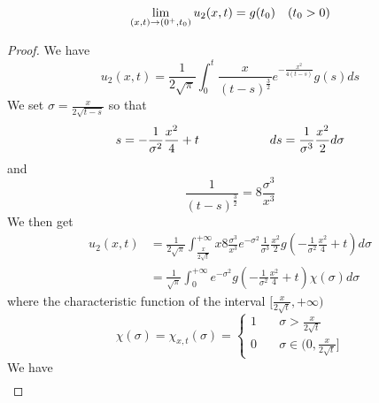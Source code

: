 \begin{itemize}
\begin{PropBox}
\begin{Proposition}
            \begin{equation*}
                \lim_{(x,t) \rightarrow (0^+, t_0)} u_2(x,t) = g(t_0) \quad (t_0 > 0)
            \end{equation*}
        \end{Proposition}
    \end{PropBox}
    \begin{ProofBox}
        \begin{proof}
            We have
            \begin{equation*}
                u_2(x,t) = \frac{1}{2\sqrt{\pi}} \int_0^t \frac{x}{(t-s)^\frac{3}{2}} e^{-\frac{x^2}{4(t-s)}}g(s) ds 
            \end{equation*}
            We set $\sigma=\frac{x}{2 \sqrt{t-s}}$ so that 
            \begin{equation*}
                s = -\frac{1}{\sigma^2} \frac{x^2}{4}+t \hspace{2 cm} ds = \frac{1}{\sigma^3} \frac{x^2}{2} d\sigma
            \end{equation*}
            and 
            \begin{equation*}
                \frac{1}{(t-s)^\frac{3}{2}} = 8 \frac{\sigma^3}{x^3}
            \end{equation*}
            We then get 
            \begin{align*}
                u_2(x,t) &= \frac{1}{2 \sqrt{\pi}} \int_{\frac{x}{2 \sqrt{t}}}^{+\infty} x 8 \frac{\sigma^3}{x^3} e^{-\sigma^2} \frac{1}{\sigma^3} \frac{x^2}{2}g(-\frac{1}{\sigma^2}\frac{x^2}{4} + t) d\sigma\\
                &= \frac{1}{\sqrt{\pi}}\int_0^{+\infty} e^{-\sigma^2} g(-\frac{1}{\sigma^2}\frac{x^2}{4}+t) \chi(\sigma) d\sigma
            \end{align*}
            where the characteristic function of the interval $[\frac{x}{2 \sqrt{t}}, +\infty)$
            \begin{equation*}
            \chi(\sigma) = \chi_{x,t}(\sigma) =
                \begin{cases}
                    1 & \quad \sigma > \frac{x}{2 \sqrt{t}}\\
                    0 & \quad \sigma \in (0,\frac{x}{2 \sqrt{t}}]
                \end{cases}
            \end{equation*}
            We have 
            \begin{equation*}
                \begin{split}

\end{split}
\end{equation*}
\end{proof}
\end{ProofBox}
\end{itemize}
